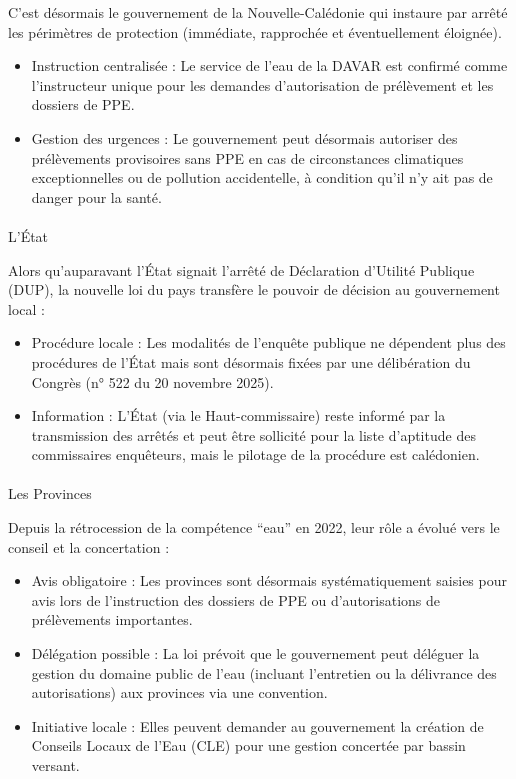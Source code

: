 \documentclass[
  11pt,
]{article}
\makeatletter
\let\oldparagraph\paragraph
\renewcommand{\paragraph}{
    \@ifstar
      \xxxParagraphStar
      \xxxParagraphNoStar
  }
\newcommand{\xxxParagraphStar}[1]{\oldparagraph*{#1}\mbox{}}
\newcommand{\xxxParagraphNoStar}[1]{\oldparagraph{#1}\mbox{}}
\providecommand{\tightlist}{%
  \setlength{\itemsep}{0pt}\setlength{\parskip}{0pt}}\usepackage{longtable,booktabs,array}
\makeatother
\begin{document}
C'est désormais le gouvernement de la Nouvelle-Calédonie qui instaure
par arrêté les périmètres de protection (immédiate, rapprochée et
éventuellement éloignée).

\begin{itemize}
\item
  Instruction centralisée : Le service de l'eau de la DAVAR est confirmé
  comme l'instructeur unique pour les demandes d'autorisation de
  prélèvement et les dossiers de PPE.
\item
  Gestion des urgences : Le gouvernement peut désormais autoriser des
  prélèvements provisoires sans PPE en cas de circonstances climatiques
  exceptionnelles ou de pollution accidentelle, à condition qu'il n'y
  ait pas de danger pour la santé.
\end{itemize}

\paragraph{L'État}\label{luxe9tat}

Alors qu'auparavant l'État signait l'arrêté de Déclaration d'Utilité
Publique (DUP), la nouvelle loi du pays transfère le pouvoir de décision
au gouvernement local :

\begin{itemize}
\tightlist
\item
  Procédure locale : Les modalités de l'enquête publique ne dépendent
  plus des procédures de l'État mais sont désormais fixées par une
  délibération du Congrès (n° 522 du 20 novembre 2025).
\item
  Information : L'État (via le Haut-commissaire) reste informé par la
  transmission des arrêtés et peut être sollicité pour la liste
  d'aptitude des commissaires enquêteurs, mais le pilotage de la
  procédure est calédonien.
\end{itemize}

\paragraph{Les Provinces}\label{les-provinces}

Depuis la rétrocession de la compétence ``eau'' en 2022, leur rôle a
évolué vers le conseil et la concertation :

\begin{itemize}
\tightlist
\item
  Avis obligatoire : Les provinces sont désormais systématiquement
  saisies pour avis lors de l'instruction des dossiers de PPE ou
  d'autorisations de prélèvements importantes.
\item
  Délégation possible : La loi prévoit que le gouvernement peut déléguer
  la gestion du domaine public de l'eau (incluant l'entretien ou la
  délivrance des autorisations) aux provinces via une convention.
\item
  Initiative locale : Elles peuvent demander au gouvernement la création
  de Conseils Locaux de l'Eau (CLE) pour une gestion concertée par
  bassin versant.
\end{itemize}
\end{document}
